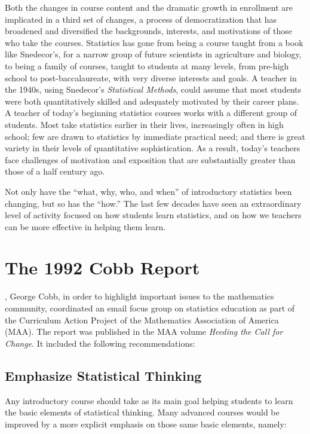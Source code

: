 Both the changes in course content and the dramatic growth in enrollment are implicated in a third set of changes, a process of democratization that has broadened and diversified the backgrounds, interests, and motivations of those who take the courses.  Statistics has gone from being a course taught from a book like Snedecor's, for a narrow group of future scientists in agriculture and biology, to being a family of courses, taught to students at many levels, from pre-high school to post-baccalaureate, with very diverse interests and goals. A teacher in the 1940s, using Snedecor's \textit{Statistical Methods}, could assume that most students were both quantitatively skilled and adequately motivated by their career plans. A teacher of today's beginning statistics courses works with a different group of students.  Most take statistics earlier in their lives, increasingly often in high school; few are drawn to statistics by immediate practical need; and there is great variety in their levels of quantitative sophistication.  As a result, today's teachers face challenges of motivation and exposition that are substantially greater than those of a half century ago.

Not only have the ``what, why, who, and when'' of introductory statistics been changing, but so has the ``how.''  The last few decades have seen an extraordinary level of activity focused on how students learn statistics, and on how we teachers can be more effective in helping them learn. 


\section{\textbf{The 1992 Cobb Report}}
, George Cobb, in order to highlight important issues to the mathematics community, coordinated an email focus group on statistics education as part of the Curriculum Action Project of the Mathematics Association of America (MAA). The report was published in the MAA volume \textit{Heeding the Call for Change}\cite{cobb1}. It included the following recommendations:

\subsection{\textbf{Emphasize Statistical Thinking}}
Any introductory course should take as its main goal helping students to learn the basic elements of statistical thinking. Many advanced courses would be improved by a more explicit emphasis on those same basic elements, namely:

